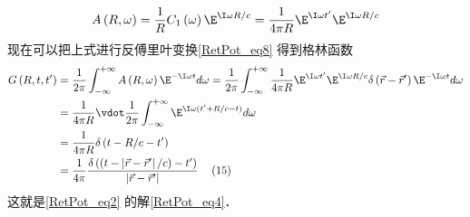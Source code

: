 \begin{equation}
A\left( {R,\omega } \right) = \frac{1}{R}{C_1}\left( \omega  \right){\E^{\I\omega R/c}} = \frac{1}{4\pi R}{\E^{\I\omega t'}}{\E^{\I\omega R/c}}
\end{equation} 
现在可以把上式进行反傅里叶变换\autoref{RetPot_eq8} 得到格林函数
\begin{equation}
\begin{aligned}
G\left( {R,t,t'} \right) &= \frac{1}{2\pi }\int_{ - \infty }^{ + \infty } {A\left( {R,\omega } \right){\E^{ -\I\omega t}}d\omega }  = \frac{1}{2\pi }\int_{ - \infty }^{ + \infty } {\frac{1}{4\pi R}{\E^{\I\omega t'}}{\E^{\I\omega R/c}}\delta \left( {\vec r - \vec r'} \right){\E^{ -\I\omega t}}d\omega } \\
&= \frac{1}{4\pi R} \vdot \frac{1}{2\pi }\int_{ - \infty }^{ + \infty } {{\E^{\I\omega (t' + R/c - t)}}d\omega } \\
&= \frac{1}{4\pi R}\delta \left( {t - R/c - t'} \right)\\
&= \frac{1}{4\pi }\frac{\delta \left( {\left( {t - \left| {\vec r - \vec r'} \right|/c} \right) - t'} \right)}{\left| {\vec r - \vec r'} \right|}{\kern 1pt} {\kern 1pt} {\kern 1pt} {\kern 1pt} {\kern 1pt} {\kern 1pt} {\kern 1pt} {\kern 1pt} {\kern 1pt} {\kern 1pt} {\kern 1pt} {\kern 1pt} (15)
\end{aligned}
\end{equation} 
这就是\autoref{RetPot_eq2} 的解\autoref{RetPot_eq4}． 

